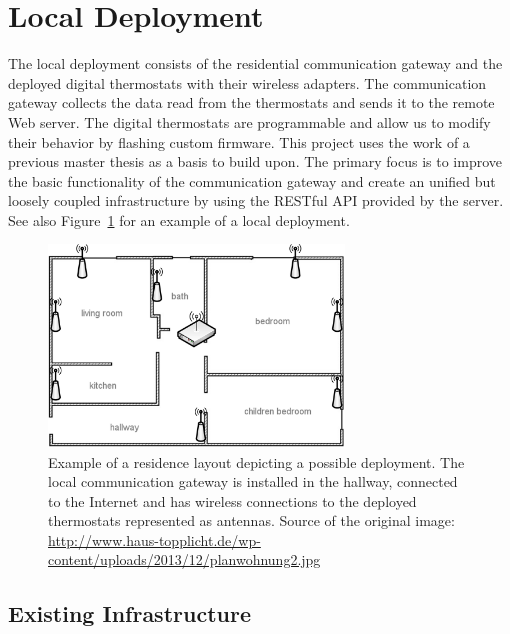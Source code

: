 
\section{Local Deployment}
\label{sec:local_infrastructure}

The local deployment consists of the residential communication gateway and the deployed digital thermostats with their wireless adapters.
The communication gateway collects the data read from the thermostats and sends it to the remote Web server.
The digital thermostats are programmable and allow us to modify their behavior by flashing custom firmware.
This project uses the work of a previous master thesis as a basis to build upon\cite{eigenmann2012opportunisticSensing}.
The primary focus is to improve the basic functionality of the communication gateway and create an unified but loosely coupled infrastructure by using the RESTful API provided by the server.
See also Figure~\ref{fig:residence_layout} for an example of a local deployment.

\begin{figure}[h]
	\begin{center}
		\includegraphics[width=0.7\textwidth]{images/residence_layout_schema.png}
	\end{center}
	\caption{Example of a residence layout depicting a possible deployment. The local communication gateway is installed in the hallway, connected to the Internet and has wireless connections to the deployed thermostats represented as antennas. Source of the original image: \url{http://www.haus-topplicht.de/wp-content/uploads/2013/12/planwohnung2.jpg}}
	\label{fig:residence_layout}
\end{figure}

\subsection{Existing Infrastructure}

